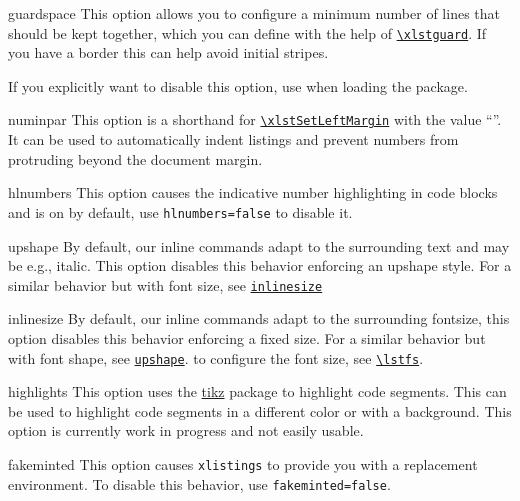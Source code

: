 \documentclass[10pt,DIV=12]{scrartcl}
\let\T\texttt
\def\argref#1#2{\hyperref[arg:#1]{\T{#2}}}
\def\cmdref#1{\hyperref[arg:#1]{\T{\xlstGetStyle{command}\textbackslash #1}}}
\begin{document}
\begin{argument}[default, ]{guardspace}
    This option allows you to configure a minimum number of lines that should be kept together, which you can define with the help of \cmdref{xlstguard}. If you have a border this can help avoid initial stripes. 
    
    If you explicitly want to disable this option, use  when loading the package.
\end{argument}

\makeatletter
\begin{argument}{numinpar}
    This option is a shorthand for \cmdref{xlstSetLeftMargin} with the value \enquote{\@@xlst@numinpar@length}.
    It can be used to automatically indent listings and prevent numbers from protruding beyond the document margin.
\end{argument}

\begin{argument}[default, ]{hlnumbers}
    This option causes the indicative number highlighting in code blocks and is on by default, use \T{hlnumbers=false} to disable it.
\end{argument}

\begin{argument}{upshape}
    By default, our inline commands adapt to the surrounding text and may be e.g., italic. This option disables this behavior enforcing an upshape style. For a similar behavior but with font size, see \argref{inlinesize}{inlinesize}
\end{argument}

\begin{argument}{inlinesize}
    By default, our inline commands adapt to the surrounding fontsize, this option disables this behavior enforcing a fixed size. For a similar behavior but with font shape, see \argref{upshape}{upshape}. to configure the font size, see \cmdref{lstfs}.
\end{argument}

\begin{argument}{highlights}
    This option uses the \href{https://ctan.org/pkg/tikz}{tikz} package to highlight code segments. This can be used to highlight code segments in a different color or with a background. This option is currently work in progress and not easily usable.
\end{argument}

\begin{argument}[default, ]{fakeminted}
    This option causes \T{xlistings} to provide you with a replacement  environment.
    To disable this behavior, use \T{fakeminted=false}.
\end{argument}
\end{document}
